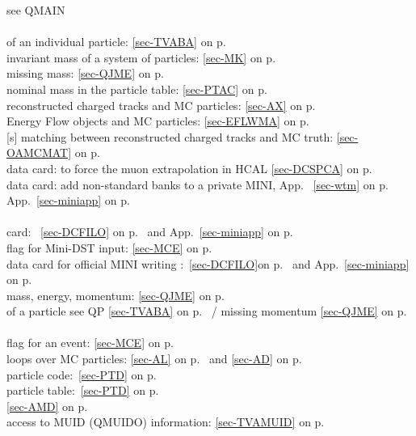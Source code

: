  see QMAIN\\
 \\
 \mysubitem of an individual particle: \ref{sec-TVABA} on p.~\pageref{sec-TVABA}\\
 \mysubitem invariant mass of a system of particles: \ref{sec-MK} on p.~\pageref{sec-MK}\\
 \mysubitem missing mass: \ref{sec-QJME} on p.~\pageref{sec-QJME}\\
 \mysubitem nominal mass in the particle table: \ref{sec-PTAC} on p.~\pageref{sec-PTAC}\\
 reconstructed charged tracks and MC particles: \ref{sec-AX} on p.~\pageref{sec-AX}\\
 Energy Flow objects and MC particles: \ref{sec-EFLWMA} on p.~\pageref{sec-EFLWMA} \\
 [s] matching between reconstructed charged tracks and MC truth:
 \ref{sec-OAMCMAT} on p.~\pageref{sec-OAMCMAT}\\
 data card: to force the muon extrapolation in HCAL
 \ref{sec-DCSPCA} on p.~\pageref{sec-DCSPCA}\\
 data card: add non-standard banks to a private MINI, App. ~\ref{sec-wtm} on p.~\pageref{sec-wtm}\\
 App.~\ref{sec-miniapp} on p.~\pageref{sec-miniapp}\\
 \\
 \mysubitem card: ~\ref{sec-DCFILO} on  p.~\pageref{sec-DCFILO} and App.~\ref{sec-miniapp} on
 p.~\pageref{sec-miniapp}\\
 \mysubitem flag for Mini-DST input: \ref{sec-MCE} on p.~\pageref{sec-MCE}\\
 data card for official MINI writing
 :~\ref{sec-DCFILO}on p.~\pageref{sec-DCFILO} and App.~\ref{sec-miniapp} on
 p.~\pageref{sec-miniapp}\\
 mass, energy, momentum: \ref{sec-QJME} on p.~\pageref{sec-QJME}\\
 of a particle see QP \ref{sec-TVABA} on p.~\pageref{sec-TVABA} /
 missing momentum \ref{sec-QJME} on p.~\pageref{sec-QJME}\\
 \\
 \mysubitem flag for an event: \ref{sec-MCE} on p.~\pageref{sec-MCE}\\
 \mysubitem loops over MC particles: \ref{sec-AL} on p.~\pageref{sec-AL} and
 \ref{sec-AD} on p.~\pageref{sec-AD}\\
 \mysubitem particle code:~\ref{sec-PTD} on p.~\pageref{sec-PTD}\\
 \mysubitem particle table:~\ref{sec-PTD} on p.~\pageref{sec-PTD}\\
 \ref{sec-AMD} on p.~\pageref{sec-AMD}\\
 access to MUID (QMUIDO)
 information: \ref{sec-TVAMUID} on p.~\pageref{sec-TVAMUID}
 
